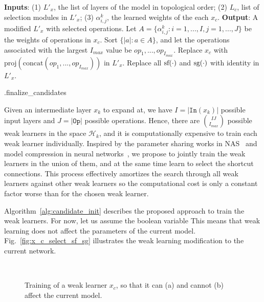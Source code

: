 \begin{algorithm}[t]
\begin{algorithmic}[1]
\STATE \textbf{Inputs}: (1) $L'_x$, the list of layers of the model in topological order;
(2) $L_c$, list of selection modules in $L'_x$;
(3) $\alpha^k_{i,j}$, the learned weights of the each $x_c$. 
\STATE \textbf{Output}: A modified $L'_x$ with selected operations.
    \STATE Let $A = \{\alpha^{k}_{i,j}: i = 1,..., I, j = 1,..., J\}$  be the weights of operations in $x_c$.
    \STATE Sort $\{ |a| : a \in A \}$, and let the operations associated with the largest $I_{max}$ value be $op_1, ..., op_{I_{max}}$.
    \STATE Replace $x_c$ with $\text{proj}(\text{concat}(op_1, ..., op_{I_{max}}))$ in $L'_x$.
\ENDFOR
\STATE Replace all $\textrm{sf} (\cdot)$ and $\textrm{sg} (\cdot)$ with identity in $L'_x$.
\end{algorithmic}
\caption{\Petridish .finalize\_candidates}
\label{alg:candidate_select}
\end{algorithm}


Given an intermediate layer $x_{k}$ to expand at, we have $I = |\texttt{In}(x_{k})|$ possible input layers and $J = |\texttt{Op}|$ possible operations.
Hence, there are $\binom{IJ}{I_{max}}$ possible weak learners
in the space $\mathcal{H}_{k}$, and it is computationally expensive to train each weak learner individually. 
Inspired by the parameter sharing works in NAS~\citep{Pham2018EfficientNA,Liu2018DARTSDA} and model compression in neural networks~\citep{huang2017condensenet},
we propose to jointly train the weak learners in the union of them, 
and at the same time learn to select the shortcut connections.  This process effectively amortizes the search through all weak learners against other weak learners so the computational cost is only a constant factor worse than for the chosen weak learner.

Algorithm~\ref{alg:candidate_init} describes the proposed approach to train the weak learners. 
For now, let us assume the boolean variable
This means that weak learning does not affect the parameters of the current model. 
Fig.~\ref{fig:x_c_select_sf_sg} illustrates the weak learning modification to the current network. 

\begin{figure}[ht]
\centering
{}
    ~
    \caption{Training of a weak learner $x_c$, so that it can (a) and cannot (b) affect the current model.}
\end{figure}

